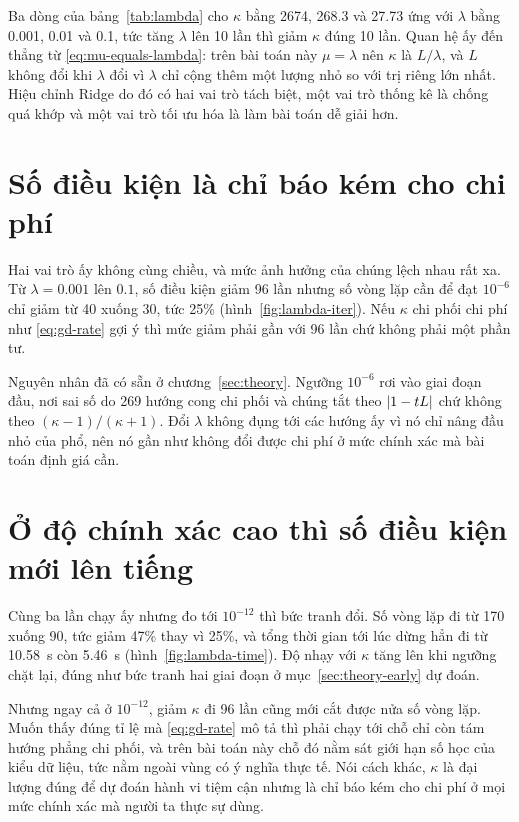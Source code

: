 Ba dòng của bảng~\ref{tab:lambda} cho $\kappa$ bằng \num{2674}, \num{268.3} và
\num{27.73} ứng với $\lambda$ bằng \num{0.001}, \num{0.01} và \num{0.1}, tức tăng
$\lambda$ lên 10 lần thì giảm $\kappa$ đúng 10 lần. Quan hệ ấy đến thẳng từ
\eqref{eq:mu-equals-lambda}: trên bài toán này $\mu = \lambda$ nên $\kappa$ là
$L/\lambda$, và $L$ không đổi khi $\lambda$ đổi vì $\lambda$ chỉ cộng thêm một
lượng nhỏ so với trị riêng lớn nhất. Hiệu chỉnh Ridge do đó có hai vai trò tách
biệt, một vai trò thống kê là chống quá khớp và một vai trò tối ưu hóa là làm bài
toán dễ giải hơn.

\section{Số điều kiện là chỉ báo kém cho chi phí}
\label{sec:lambda-early}

Hai vai trò ấy không cùng chiều, và mức ảnh hưởng của chúng lệch nhau rất xa. Từ
$\lambda = \num{0.001}$ lên $\num{0.1}$, số điều kiện giảm 96 lần nhưng số vòng
lặp cần để đạt $10^{-6}$ chỉ giảm từ 40 xuống 30, tức 25\%
(hình~\ref{fig:lambda-iter}). Nếu $\kappa$ chi phối chi phí như \eqref{eq:gd-rate}
gợi ý thì mức giảm phải gần với 96 lần chứ không phải một phần tư.

Nguyên nhân đã có sẵn ở chương~\ref{sec:theory}. Ngưỡng $10^{-6}$ rơi vào giai
đoạn đầu, nơi sai số do 269 hướng cong chi phối và chúng tắt theo $\lvert1 - tL\rvert$
chứ không theo $(\kappa-1)/(\kappa+1)$. Đổi $\lambda$ không đụng tới các hướng ấy
vì nó chỉ nâng đầu nhỏ của phổ, nên nó gần như không đổi được chi phí ở mức chính
xác mà bài toán định giá cần.

\section{Ở độ chính xác cao thì số điều kiện mới lên tiếng}
\label{sec:lambda-tail}

Cùng ba lần chạy ấy nhưng đo tới $10^{-12}$ thì bức tranh đổi. Số vòng lặp đi từ
170 xuống 90, tức giảm 47\% thay vì 25\%, và tổng thời gian tới lúc dừng hẳn đi
từ \SI{10.58}{\second} còn \SI{5.46}{\second} (hình~\ref{fig:lambda-time}). Độ
nhạy với $\kappa$ tăng lên khi ngưỡng chặt lại, đúng như bức tranh hai giai đoạn
ở mục~\ref{sec:theory-early} dự đoán.

Nhưng ngay cả ở $10^{-12}$, giảm $\kappa$ đi 96 lần cũng mới cắt được nửa số vòng
lặp. Muốn thấy đúng tỉ lệ mà \eqref{eq:gd-rate} mô tả thì phải chạy tới chỗ chỉ
còn tám hướng phẳng chi phối, và trên bài toán này chỗ đó nằm sát giới hạn số học
của kiểu dữ liệu, tức nằm ngoài vùng có ý nghĩa thực tế. Nói cách khác, $\kappa$
là đại lượng đúng để dự đoán hành vi tiệm cận nhưng là chỉ báo kém cho chi phí ở
mọi mức chính xác mà người ta thực sự dùng.

